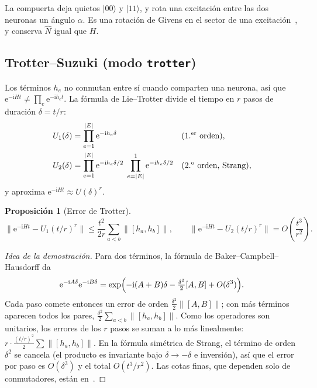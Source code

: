 \documentclass[11pt,a4paper]{article}
\renewcommand{\ket}[1]{\lvert #1\rangle}
\newcommand{\e}{\mathrm{e}}
\newcommand{\ii}{\mathrm{i}}
\newcommand{\Nop}{\hat N}
\newcommand{\code}[1]{\texttt{#1}}
\theoremstyle{plain}
\newtheorem{proposicion}{Proposición}[section]
\theoremstyle{definition}
\theoremstyle{remark}
\begin{document}
La compuerta deja quietos $\ket{00}$ y $\ket{11}$, y rota una excitación entre las dos neuronas un ángulo $\alpha$. Es una rotación de Givens en el sector de una excitación~\cite{kivlichan2018}, y conserva $\Nop$ igual que $H$.

\subsection{Trotter--Suzuki (modo \code{trotter})}

Los términos $h_e$ no conmutan entre sí cuando comparten una neurona, así que $\e^{-\ii Ht}\ne\prod_e\e^{-\ii h_et}$. La fórmula de Lie--Trotter divide el tiempo en $r$ pasos de duración $\delta=t/r$:
\begin{align}
U_1(\delta) &= \prod_{e=1}^{|E|}\e^{-\ii h_e\delta}
&&\text{(1.\textsuperscript{er} orden)},\\
U_2(\delta) &= \prod_{e=1}^{|E|}\e^{-\ii h_e\delta/2}\;\prod_{e=|E|}^{1}\e^{-\ii h_e\delta/2}
&&\text{(2.\textsuperscript{o} orden, Strang)},
\end{align}
y aproxima $\e^{-\ii Ht}\approx U(\delta)^r$.

\begin{proposicion}[Error de Trotter]\label{prop:trotter}
\begin{equation}
\bigl\lVert\e^{-\ii Ht}-U_1(t/r)^r\bigr\rVert\le\frac{t^2}{2r}\sum_{a<b}\bigl\lVert[h_a,h_b]\bigr\rVert,
\qquad
\bigl\lVert\e^{-\ii Ht}-U_2(t/r)^r\bigr\rVert=O\!\left(\frac{t^3}{r^2}\right).
\end{equation}
\end{proposicion}

\begin{proof}[Idea de la demostración]
Para dos términos, la fórmula de Baker--Campbell--Hausdorff da
\[
\e^{-\ii A\delta}\e^{-\ii B\delta}=\exp\Bigl(-\ii(A+B)\delta-\tfrac{\delta^2}{2}[A,B]+O(\delta^3)\Bigr).
\]
Cada paso comete entonces un error de orden $\frac{\delta^2}2\lVert[A,B]\rVert$; con más términos aparecen todos los pares, $\frac{\delta^2}{2}\sum_{a<b}\lVert[h_a,h_b]\rVert$. Como los operadores son unitarios, los errores de los $r$ pasos se suman a lo más linealmente: $r\cdot\frac{(t/r)^2}2\sum\lVert[h_a,h_b]\rVert$. En la fórmula simétrica de Strang, el término de orden $\delta^2$ se cancela (el producto es invariante bajo $\delta\to-\delta$ e inversión), así que el error por paso es $O(\delta^3)$ y el total $O(t^3/r^2)$. Las cotas finas, que dependen solo de conmutadores, están en~\cite{childs2021}.
\end{proof}
\end{document}
